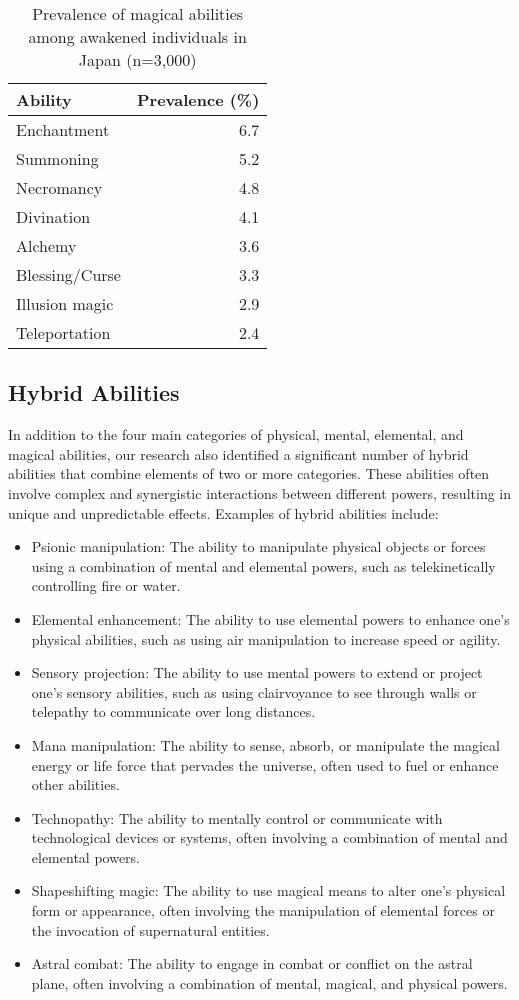 \documentclass[12pt]{article}
\begin{document}
\begin{table}[h]
\centering
\caption{Prevalence of magical abilities among awakened individuals in Japan (n=3,000)}
\label{tab:magicalabilities}
\begin{tabular}{lr}
\toprule
Ability & Prevalence (\%) \\
\midrule
Enchantment & 6.7 \\
Summoning & 5.2 \\
Necromancy & 4.8 \\
Divination & 4.1 \\
Alchemy & 3.6 \\
Blessing/Curse & 3.3 \\
Illusion magic & 2.9 \\
Teleportation & 2.4 \\
\bottomrule
\end{tabular}
\end{table}

\subsection{Hybrid Abilities}
In addition to the four main categories of physical, mental, elemental, and magical abilities, our research also identified a significant number of hybrid abilities that combine elements of two or more categories. These abilities often involve complex and synergistic interactions between different powers, resulting in unique and unpredictable effects. Examples of hybrid abilities include:

\begin{itemize}
    \item Psionic manipulation: The ability to manipulate physical objects or forces using a combination of mental and elemental powers, such as telekinetically controlling fire or water.
    \item Elemental enhancement: The ability to use elemental powers to enhance one's physical abilities, such as using air manipulation to increase speed or agility.
    \item Sensory projection: The ability to use mental powers to extend or project one's sensory abilities, such as using clairvoyance to see through walls or telepathy to communicate over long distances.
    \item Mana manipulation: The ability to sense, absorb, or manipulate the magical energy or life force that pervades the universe, often used to fuel or enhance other abilities.
    \item Technopathy: The ability to mentally control or communicate with technological devices or systems, often involving a combination of mental and elemental powers.
    \item Shapeshifting magic: The ability to use magical means to alter one's physical form or appearance, often involving the manipulation of elemental forces or the invocation of supernatural entities.
    \item Astral combat: The ability to engage in combat or conflict on the astral plane, often involving a combination of mental, magical, and physical powers.
\end{itemize}
\end{document}
